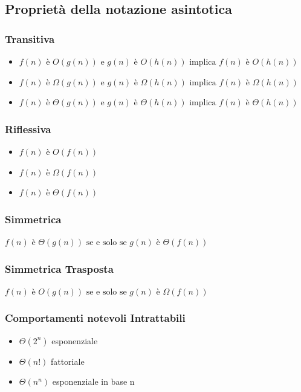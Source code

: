 \documentclass[12pt]{article}
\begin{document}
\subsection*{Proprietà della notazione asintotica}
\subsubsection*{Transitiva}
\begin{itemize}
    \setlength\itemsep{0em}
    \item \(f(n) \text{ è } O(g(n)) \text{ e } g(n) \text{ è } O(h(n)) \text{ implica } f(n) \text{ è } O(h(n))\)
    \item \(f(n) \text{ è } \Omega(g(n)) \text{ e } g(n) \text{ è } \Omega(h(n)) \text{ implica } f(n) \text{ è } \Omega(h(n))\)
    \item \(f(n) \text{ è } \Theta(g(n)) \text{ e } g(n) \text{ è } \Theta(h(n)) \text{ implica } f(n) \text{ è } \Theta(h(n))\)
\end{itemize}
\subsubsection*{Riflessiva}
\begin{itemize}
    \setlength\itemsep{0em}
    \item \(f(n) \text{ è } O(f(n))\)
    \item \(f(n) \text{ è } \Omega(f(n))\)
    \item \(f(n) \text{ è } \Theta(f(n))\)
\end{itemize}
\subsubsection*{Simmetrica}
\(f(n) \text{ è } \Theta(g(n)) \text{ se e solo se } g(n) \text{ è } \Theta(f(n))\)
\subsubsection*{Simmetrica Trasposta}
\(f(n) \text{ è } O(g(n)) \text{ se e solo se } g(n) \text{ è } \Omega(f(n))\)
\subsubsection*{Comportamenti notevoli Intrattabili}
\begin{itemize}
    \setlength\itemsep{0em}
    \item \(\Theta(2^{n})\) esponenziale
    \item \(\Theta(n!)\) fattoriale
    \item \(\Theta(n^{n})\) esponenziale in base n
\end{itemize}
\end{document}
